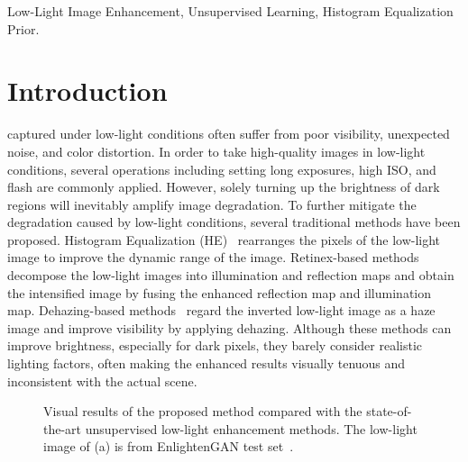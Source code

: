 \documentclass[journal]{IEEEtran}
\begin{document}
\begin{IEEEkeywords}
Low-Light Image Enhancement, Unsupervised Learning, Histogram Equalization Prior.
\end{IEEEkeywords}

\IEEEpeerreviewmaketitle

\section{Introduction}
 captured under low-light conditions often suffer from poor visibility, unexpected noise, and color distortion. 
In order to take high-quality images in low-light conditions, several operations including setting long exposures, high ISO, and flash are commonly applied. However, solely turning up the brightness of dark regions will inevitably amplify image degradation.
To further mitigate the degradation caused by low-light conditions, several traditional methods have been proposed. Histogram Equalization (HE)~\cite{pizer1990contrast} rearranges the pixels of the low-light image to improve the dynamic range of the image. Retinex-based methods~\cite{wang2013naturalness, wang2014variational} decompose the low-light images into illumination and reflection maps and obtain the intensified image by fusing the enhanced reflection map and illumination map. Dehazing-based methods~\cite{dong2011fast, li2015low} regard the inverted low-light image as a haze image and improve visibility by applying dehazing. Although these methods can improve brightness, especially for dark pixels, they barely consider realistic lighting factors, often making the enhanced results visually tenuous and inconsistent with the actual scene.

\begin{figure}
    \begin{center}
    \hspace*{-2mm}
    \hspace*{-2mm}
    \caption{Visual results of the proposed method compared with the state-of-the-art unsupervised low-light enhancement methods. The low-light image of (a) is from EnlightenGAN test set~\cite{jiang2021enlightengan}.}
    \label{fig:intro}
    \end{center}
\end{figure}
\end{document}
